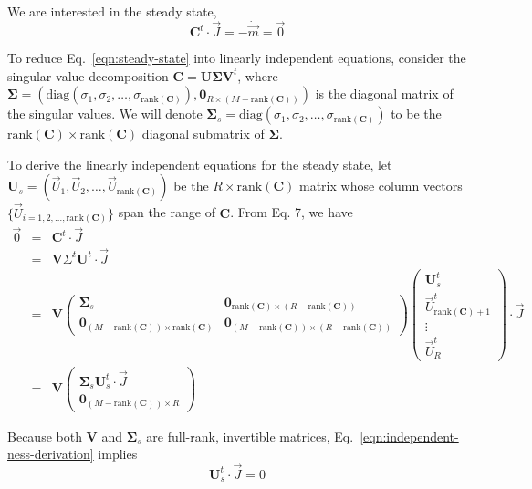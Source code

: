 \documentclass[aps,groupedaddress]{revtex4}
\newcommand*{\mat}[1]{\mathbf{#1}}
\newcommand*{\rank}[1]{\mathrm{rank}({#1})}
\newcommand*{\diag}[1]{\mathrm{diag}({#1})}
\begin{document}
We are interested in the steady state, 
\begin{equation}
\mat{C}^t\cdot \vec{J} = -\dot{\vec{m}} = \vec{0}
\label{eqn:steady-state}
\end{equation}

To reduce Eq.~\ref{eqn:steady-state} into linearly independent
equations, consider the singular value decomposition $\mat{C} =
\mat{U}\mat{\Sigma}\mat{V}^t$, where $\mat{\Sigma} = ( \diag{\sigma_1,
  \sigma_2, \dots, \sigma_{\rank{\mat{C}}}}, \mat{0}_{R\times(M -
  \rank{\mat{C}})} )$ is the diagonal matrix of the singular
values. We will denote $\mat{\Sigma}_s = \diag{\sigma_1, \sigma_2,
  \dots, \sigma_{\rank{\mat{C}}}}$ to be the
$\rank{\mat{C}}\times\rank{\mat{C}}$ diagonal submatrix of
$\mat{\Sigma}$.

To derive the linearly independent equations for the steady state, let
$\mat{U}_s = ( \vec{U}_1, \vec{U}_2, \dots, \vec{U}_{\rank{\mat{C}}} )$ be the
$R\times\rank{\mat{C}}$ matrix whose column vectors $\{
\vec{U}_{i=1,2,\dots, \rank{\mat{C}}} \}$ span the range of $\mat{C}$. From
Eq. 7, we have
\begin{eqnarray}
\vec{0} &=& \mat{C}^t\cdot\vec{J} 
\nonumber \\
&=& \mat{V} \Sigma^t \mat{U}^t\cdot\vec{J}
\nonumber \\
&=& \mat{V} \left( \begin{array}{cc}
  \mat{\Sigma}_s & \mat{0}_{\rank{\mat{C}}\times(R - \rank{\mat{C}})} \\
  \mat{0}_{(M-\rank{\mat{C}})\times\rank{\mat{C}}} & \mat{0}_{(M-\rank{\mat{C}})\times(R - \rank{\mat{C}})} 
\end{array} \right) 
\left( 
\begin{array}{c}
\mat{U}_s^t \\
\vec{U}_{\rank{\mat{C}} + 1}^t \\
\vdots \\
\vec{U}_R^t 
\end{array} \right) \cdot\vec{J}
\nonumber \\
&=& \mat{V} \left(
\begin{array}{c}
\mat{\Sigma}_s \mat{U}_s^t\cdot\vec{J}\\
\mat{0}_{(M-\rank{\mat{C}})\times R}
\end{array} \right)
\label{eqn:independent-ness-derivation}
\end{eqnarray}
   
Because both $\mat{V}$ and $\mat{\Sigma}_s$ are full-rank, 
invertible matrices, Eq.~\ref{eqn:independent-ness-derivation}
implies
\begin{equation}
\mat{U}_s^t\cdot \vec{J} = 0
\label{eqn:independent-ness}
\end{equation}
\end{document}
